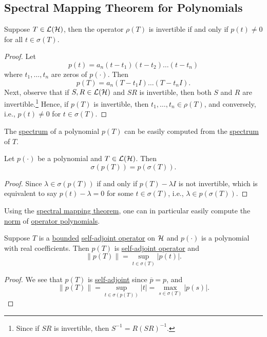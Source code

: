 \subsection{Spectral Mapping Theorem for Polynomials}

\begin{lemma}[Invertibility]\label{lma:invertibility}
	Suppose \(T\in \mathcal{\MakeUppercase{l}} (\mathcal{\MakeUppercase{h}} )\), then the operator \(\rho (T)\) is invertible if and only if \(p(t) \neq 0\) for all \(t\in \sigma (T)\).
\end{lemma}
\begin{proof}
	Let
	\[
		p(t) = a_n (t-t_1)(t-t_2)\ldots  (t-t_n)
	\]
	where \(t_1, \ldots  , t_n\) are zeros of \(p(\cdot)\). Then
	\[
		p(T) = a_n (T-t_1 I)\ldots  (T-t_n I).
	\]
	Next, observe that if \(S, R\in \mathcal{\MakeUppercase{l}} (\mathcal{\MakeUppercase{h}} )\) and \(SR\) is invertible, then both \(S\) and \(R\) are invertible.\footnote{Since if \(SR\) is invertible, then \(S^{-1} = R(SR)^{-1} \).} Hence, if \(p(T)\) is invertible, then \(t_1, \ldots  , t_n\in \rho (T)\), and conversely, i.e., \(p(t) \neq 0\) for \(t\in \sigma (T)\).
\end{proof}

The \hyperref[def:spectrum-point]{spectrum} of a polynomial \(p(T)\) can be easily computed from the \hyperref[def:spectrum-point]{spectrum} of \(T\).
\begin{theorem}\label{thm:spectral-mapping}
	Let \(p(\cdot)\) be a polynomial and \(T\in \mathcal{\MakeUppercase{l}} (\mathcal{\MakeUppercase{h}} )\). Then
	\[
		\sigma (p(T)) = p(\sigma (T)).
	\]
\end{theorem}
\begin{proof}
	Since \(\lambda \in \sigma (p(T))\) if and only if \(p(T) - \lambda I\) is not invertible, which is equivalent to say \(p(t) - \lambda = 0\) for some \(t\in \sigma (T)\), i.e., \(\lambda \in p(\sigma (T))\).
\end{proof}

Using the \hyperref[thm:spectral-mapping]{spectral mapping theorem}, one can in particular easily compute the \hyperref[def:norm]{norm} of \hyperref[def:polynomials-of-an-op]{operator polynomials}.

\begin{corollary}\label{col:op-norm-of-polynomials}
	Suppose \(T\) is a \hyperref[rmk:bounded-op]{bounded} \hyperref[def:self-adjoint-op]{self-adjoint operator} on \(\mathcal{\MakeUppercase{h}} \) and \(p(\cdot)\) is a polynomial with real coefficients. Then \(p(T)\) is \hyperref[def:self-adjoint-op]{self-adjoint operator} and
	\[
		\lVert p(T) \rVert = \sup _{t\in \sigma (T)}\vert p(t) \vert.
	\]
\end{corollary}
\begin{proof}
	We see that \(p(T)\) is \hyperref[def:self-adjoint-op]{self-adjoint} since \(\overline{p} = p\), and
	\[
		\lVert p(T) \rVert = \sup _{t\in \sigma (p(T))} \vert t \vert = \max _{s\in \sigma (T)} \vert p(s) \vert .
	\]
\end{proof}
